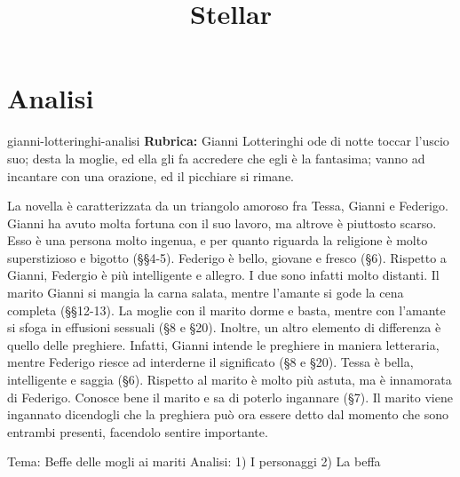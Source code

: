 \documentclass[preview]{standalone}
\begin{document}
\title{Stellar}
\genpage

\section{Analisi}

\begin{snippet}{gianni-lotteringhi-analisi}
    \textbf{Rubrica:} Gianni Lotteringhi ode di notte toccar l'uscio suo; desta la moglie, ed ella gli fa accredere che egli è la fantasima; vanno ad incantare con una orazione, ed il picchiare si rimane.

    
    La novella è caratterizzata da un triangolo amoroso fra Tessa, Gianni e Federigo.
    Gianni ha avuto molta fortuna con il suo lavoro, ma altrove è piuttosto scarso.
    Esso è una persona molto ingenua, e per quanto riguarda la religione è molto
    superstizioso e bigotto (§§4-5).
    Federigo è bello, giovane e fresco (§6).
    Rispetto a Gianni, Federgio è più intelligente e allegro.
    I due sono infatti molto distanti.
    Il marito Gianni si mangia la carna salata, mentre l'amante si gode la cena completa (§§12-13).
    La moglie con il marito dorme e basta, mentre con l'amante si sfoga in effusioni sessuali (§8 e §20).
    Inoltre, un altro elemento di differenza è quello delle preghiere. Infatti, Gianni intende le preghiere in maniera letteraria,
    mentre Federigo riesce ad interderne il significato (§8 e §20).
    Tessa è bella, intelligente e saggia (§6). Rispetto al marito è molto più astuta, ma è innamorata di Federigo.
    Conosce bene il marito e sa di poterlo ingannare (§7).
    Il marito viene ingannato dicendogli che la preghiera può ora essere detto dal momento che sono
    entrambi presenti, facendolo sentire importante.
    
    
\end{snippet}


Tema: Beffe delle mogli ai mariti 
Analisi: 
	1) I personaggi
	2) La beffa
\end{document}
